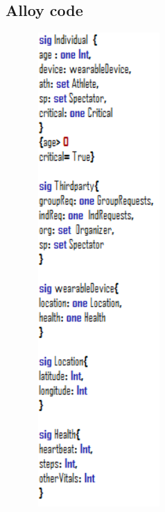 \subsection{Alloy code}
\begin{figure}[H]
	\includegraphics[width=5cm,height=18cm]{./Alloy/sig1.PNG}
\end{figure}
